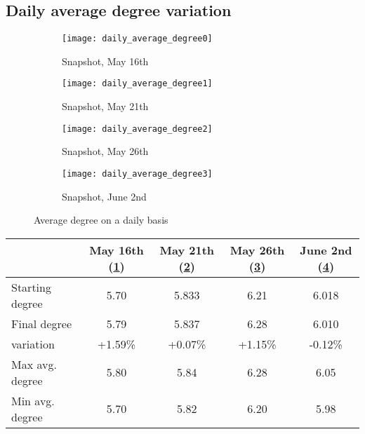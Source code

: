 	\newpage
	\subsection{Daily average degree variation}

		

	\begin{figure}[t]
		\centering
		\begin{subfigure}{0.45\textwidth}
			\centering
			\texttt{[image: daily\_average\_degree0]}
			\caption{Snapshot, May 16th}
			\label{daily_degree0}
		\end{subfigure}
		\begin{subfigure}{0.45\textwidth}
			\centering
			\texttt{[image: daily\_average\_degree1]}
			\caption{Snapshot, May 21th}
			\label{daily_degree1}
		\end{subfigure}
		\begin{subfigure}{0.45\textwidth}
			\centering
			\texttt{[image: daily\_average\_degree2]}
			\caption{Snapshot, May 26th}
			\label{daily_degree2}
		\end{subfigure}
		\begin{subfigure}{0.45\textwidth}
			\centering
			\texttt{[image: daily\_average\_degree3]}
			\caption{Snapshot, June 2nd}
			\label{daily_degree3}
		\end{subfigure}
		
		\caption{Average degree on a daily basis}
		\label{daily_degree _variation}
	\end{figure}
		\begin{center}
		\begin{tabulary}{\linewidth}{| L | C | C | C | C |}
			\hline	
			& May 16th (\ref{daily_degree0}) & May 21th (\ref{daily_degree1}) & May 26th (\ref{daily_degree2}) & June 2nd (\ref{daily_degree3}) \\
			\hline
			Starting degree & 5.70 & 5.833 & 6.21  & 6.018 \\ \hline
			Final degree & 5.79 & 5.837 & 6.28 & 6.010 \\ \hline
			variation & +1.59\% & +0.07\% & +1.15\% & -0.12\% \\ \hline
			Max avg. degree & 5.80 & 5.84 & 6.28 & 6.05 \\ \hline
			Min avg. degree & 5.70 & 5.82 & 6.20 & 5.98 \\ \hline		
		\end{tabulary}
	\end{center}
	
